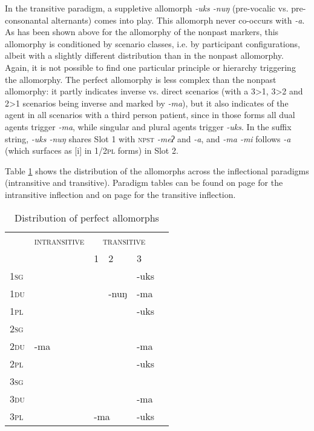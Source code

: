 In the transitive paradigm, a suppletive allomorph \emph{-uks \ti -nuŋ} (pre-vocalic vs. pre-consonantal alternants) comes into play. This allomorph never co-occurs with \emph{-a}. As has been shown above for the allomorphy of the nonpast markers, this allomorphy is conditioned by scenario classes, i.e. by participant configurations, albeit with a slightly different distribution than in the nonpast allomorphy. Again, it is  not possible to find one particular  principle or hierarchy triggering the allomorphy. The perfect allomorphy is less complex than the nonpast allomorphy: it partly indicates inverse vs. direct scenarios (with a 3>1, 3>2 and 2>1 scenarios being inverse and marked by \emph{-ma}), but it also indicates  of the agent in all scenarios with a third person patient, since in those forms all dual agents trigger \emph{-ma}, while singular and plural agents trigger \emph{-uks}. In the suffix string, \emph{-uks \ti -nuŋ} shares Slot 1 with {\scshape npst} \emph{-meʔ} and   \emph{-a}, and \emph{-ma \ti -mi} follows  \emph{-a} (which surfaces as [i] in {\scshape  1/2pl} forms)  in Slot 2.

Table \ref{par-prf-allo} shows the distribution of the allomorphs across the inflectional paradigms (intransitive and transitive). Paradigm tables can be found on page \pageref{par-apma-pst} for the intransitive inflection and on page \pageref{par-chimd-prf} for the transitive inflection. 

\begin{table}
\begin{centering} 
\begin{tabular}{|l||p{1.7cm}|p{1.5cm}|p{1.5cm}|p{1.5cm}|p{1.5cm}|}
\hline
		& {\scshape intransitive}&	\multicolumn{3}{c|}{ {\scshape transitive}}  \\
		\cline{3-5}
		&&	 {\scshape 1}&  {\scshape 2} & {\scshape  3} \\
\hline
\hline
 {\scshape 1sg} 		&& \cellcolor[gray]{.8}&&-uks \\
 \cline{1-1} \cline{5-5} 		
 {\scshape 1du}		& & \cellcolor[gray]{.8}&-nuŋ&-ma\\
 \cline{1-1} \cline{5-5} 			
 {\scshape 1pl}	&& \cellcolor[gray]{.8}&&-uks \\
 \cline{1-1}  \cline{3-4} 		
 {\scshape 2sg	}	& &&\cellcolor[gray]{.8} &   \\
 \cline{1-1} \cline{5-5}			
 {\scshape 2du}	&-ma &&\cellcolor[gray]{.8}  &-ma\\
 \cline{1-1} \cline{5-5}			
 {\scshape 2pl}	& &&\cellcolor[gray]{.8}   &-uks \\
\cline{1-1}  \cline{4-4} 
 {\scshape 3sg}		&&\multicolumn{2}{c|}{}  & \\
  \cline{1-1}  \cline{5-5}					
 {\scshape 3du}&&\multicolumn{2}{c|}{}  &-ma\\
 \cline{1-1} \cline{5-5}
 {\scshape 3pl}& &\multicolumn{2}{l|}{-ma}  &-uks \\
\hline
\end{tabular}
\caption{Distribution of perfect allomorphs}\label{par-prf-allo}
\end{centering}
\end{table}

